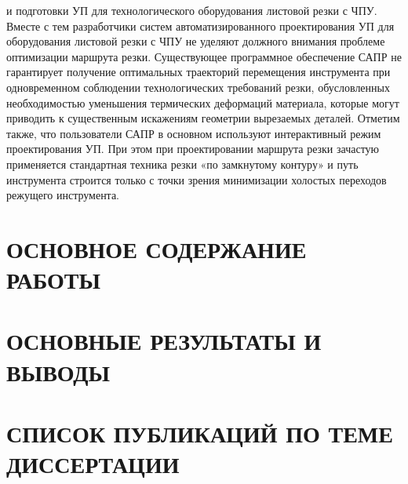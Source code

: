 \documentclass[14pt]{extarticle}
\begin{document}
и подготовки УП для технологического оборудования листовой резки с ЧПУ. 
Вместе с тем разработчики систем автоматизированного проектирования УП 
для оборудования листовой резки с ЧПУ не уделяют должного внимания 
проблеме оптимизации маршрута резки. 
Существующее программное обеспечение САПР не гарантирует 
получение оптимальных траекторий перемещения инструмента 
при одновременном соблюдении технологических требований резки, 
обусловленных необходимостью уменьшения термических деформаций материала, 
которые могут приводить к существенным искажениям геометрии вырезаемых деталей. 
Отметим также, что пользователи САПР в основном используют интерактивный режим проектирования УП. 
При этом при проектировании маршрута резки зачастую применяется 
стандартная техника резки «по замкнутому контуру» и путь инструмента строится 
только с точки зрения минимизации холостых переходов режущего инструмента.

\section*{ОСНОВНОЕ СОДЕРЖАНИЕ РАБОТЫ}

\section*{ОСНОВНЫЕ РЕЗУЛЬТАТЫ И ВЫВОДЫ}

\section*{СПИСОК ПУБЛИКАЦИЙ ПО ТЕМЕ ДИССЕРТАЦИИ}
\end{document}
